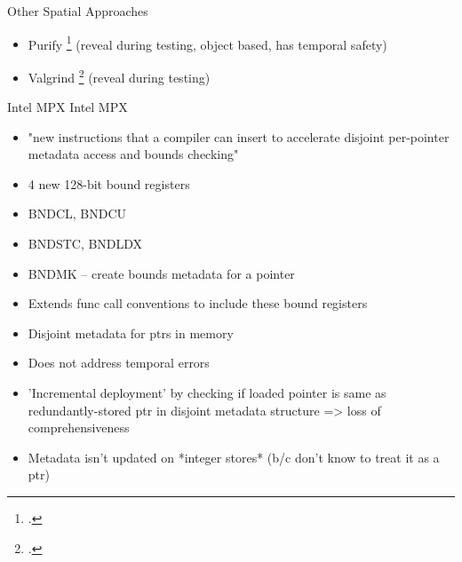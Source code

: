 
\begin{frame}{Other Spatial Approaches}
\begin{itemize}
    \item Purify \footcite{hastings_purify:_1991} (reveal during testing, object based, has temporal safety)
    \item Valgrind \footcite{nethercote_how_2007} (reveal during testing)
\end{itemize}
\end{frame}

\begin{frame}{Intel MPX}
\footnotesize
  Intel MPX %
    \begin{itemize}
     \item "new instructions that a compiler can insert to accelerate disjoint per-pointer metadata access and bounds checking"
     \item 4 new 128-bit bound registers
     \item BNDCL, BNDCU
     \item BNDSTC, BNDLDX
     \item BNDMK -- create bounds metadata for a pointer
     \item Extends func call conventions to include these bound registers
     \item Disjoint metadata for ptrs in memory
     \item Does not address temporal errors
     \item 'Incremental deployment' by checking if loaded pointer is same as redundantly-stored ptr in disjoint metadata structure => loss of comprehensiveness
     \item Metadata isn't updated on *integer stores* (b/c don't know to treat it as a ptr)
    \end{itemize}
\end{frame}

